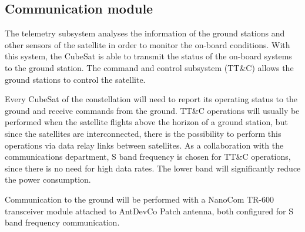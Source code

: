 \subsection{Communication module}

The telemetry subsystem analyses the information of the ground stations and other sensors of the satellite in order to monitor the on-board conditions. With this system, the CubeSat is able to transmit the status of the on-board systems to the ground station. The command and control subsystem (TT\&C) allows the ground stations to control the satellite.

Every CubeSat of the constellation will need to report its operating status to the ground and receive commands from the ground. TT\&C operations will usually be performed when the satellite flights above the horizon of a ground station, but since the satellites are interconnected, there is the possibility to perform this operations via data relay links between satellites. As a collaboration with the communications department, S band frequency is chosen for TT\&C operations, since there is no need for high data rates. The lower band will significantly reduce the power consumption.

Communication to the ground will be performed with a NanoCom TR-600 transceiver module attached to AntDevCo Patch antenna, both configured for S band frequency communication.